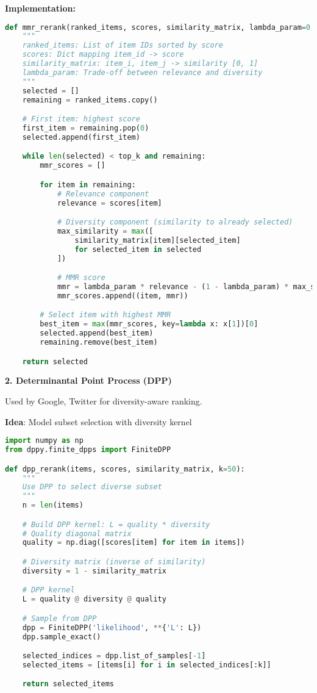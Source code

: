 \documentclass[10pt]{article}
\begin{document}
\textbf{Implementation:}
\begin{lstlisting}[language=Python]
def mmr_rerank(ranked_items, scores, similarity_matrix, lambda_param=0.7, top_k=50):
    """
    ranked_items: List of item IDs sorted by score
    scores: Dict mapping item_id -> score
    similarity_matrix: item_i, item_j -> similarity [0, 1]
    lambda_param: Trade-off between relevance and diversity
    """
    selected = []
    remaining = ranked_items.copy()

    # First item: highest score
    first_item = remaining.pop(0)
    selected.append(first_item)

    while len(selected) < top_k and remaining:
        mmr_scores = []

        for item in remaining:
            # Relevance component
            relevance = scores[item]

            # Diversity component (similarity to already selected)
            max_similarity = max([
                similarity_matrix[item][selected_item]
                for selected_item in selected
            ])

            # MMR score
            mmr = lambda_param * relevance - (1 - lambda_param) * max_similarity
            mmr_scores.append((item, mmr))

        # Select item with highest MMR
        best_item = max(mmr_scores, key=lambda x: x[1])[0]
        selected.append(best_item)
        remaining.remove(best_item)

    return selected
\end{lstlisting}

\textbf{2. Determinantal Point Process (DPP)}

Used by Google, Twitter for diversity-aware ranking.

\textbf{Idea}: Model subset selection with diversity kernel

\begin{lstlisting}[language=Python]
import numpy as np
from dppy.finite_dpps import FiniteDPP

def dpp_rerank(items, scores, similarity_matrix, k=50):
    """
    Use DPP to select diverse subset
    """
    n = len(items)

    # Build DPP kernel: L = quality * diversity
    # Quality diagonal matrix
    quality = np.diag([scores[item] for item in items])

    # Diversity matrix (inverse of similarity)
    diversity = 1 - similarity_matrix

    # DPP kernel
    L = quality @ diversity @ quality

    # Sample from DPP
    dpp = FiniteDPP('likelihood', **{'L': L})
    dpp.sample_exact()

    selected_indices = dpp.list_of_samples[-1]
    selected_items = [items[i] for i in selected_indices[:k]]

    return selected_items
\end{lstlisting}
\end{document}
